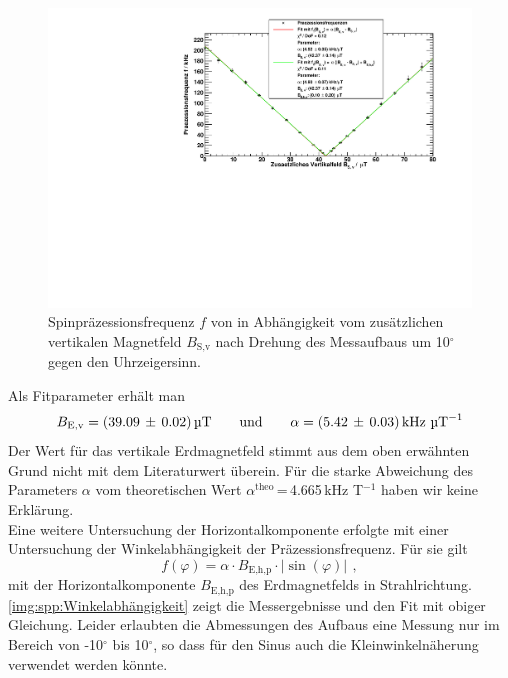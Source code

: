 \begin{figure}[H]
\begin{center}
  \includegraphics[width=\textwidth]{../img/part4/Rb85_gedreht.pdf}
  \caption{Spinpräzessionsfrequenz $f$ von  in Abhängigkeit
  vom zusätzlichen vertikalen Magnetfeld $B_\text{S,v}$
  nach Drehung des Messaufbaus um 10$^\circ$ gegen den Uhrzeigersinn.}
  \label{img:spp:SPPRb87gedr}
\end{center}
\end{figure} 

Als Fitparameter erhält man
\begin{equation}
  B_\text{E,v} = (39.09\,\pm\,0.02)\,\text{\textmu T} \qquad \text{und} \qquad \alpha = (5.42\,\pm\,0.03)\,\text{kHz } \text{\textmu T}^{-1}
\end{equation}
Der Wert für das vertikale Erdmagnetfeld stimmt aus dem oben erwähnten Grund nicht mit dem Literaturwert überein.
Für die starke Abweichung des Parameters $\alpha$ vom theoretischen Wert $\alpha^\text{theo}$\,=\,4.665\,kHz \textmu T$^{-1}$ haben wir keine Erklärung.\\

Eine weitere Untersuchung der Horizontalkomponente erfolgte mit einer Untersuchung der Winkelabhängigkeit
der Präzessionsfrequenz.
Für sie gilt
\begin{equation}
  f(\varphi) = \alpha \cdot B_\text{E,h,p} \cdot |\sin(\varphi)| \ \, ,  %
\end{equation}
mit der Horizontalkomponente $B_\text{E,h,p}$ des Erdmagnetfelds in Strahlrichtung.
\autoref{img:spp:Winkelabhängigkeit} zeigt die Messergebnisse und den Fit mit obiger Gleichung.
Leider erlaubten die Abmessungen des Aufbaus eine Messung nur im Bereich von -10$^\circ$ bis 10$^\circ$,
so dass für den Sinus auch die Kleinwinkelnäherung verwendet werden könnte.

